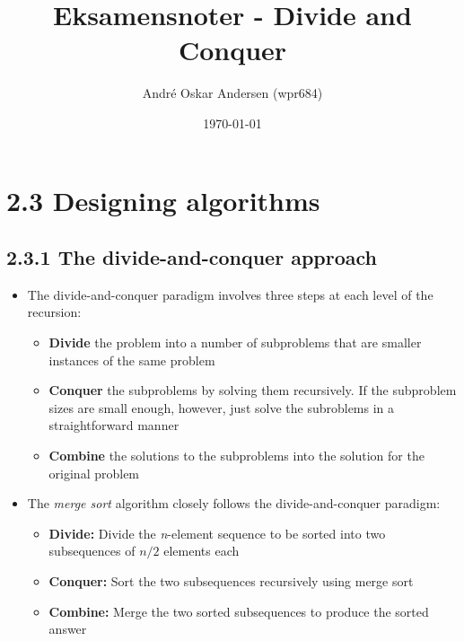 \documentclass{report}
\title{Eksamensnoter - Divide and Conquer}
\author{André Oskar Andersen (wpr684)}
\date{\today}
\begin{document}
\maketitle

\section*{2.3 Designing algorithms}
\subsection*{2.3.1 The divide-and-conquer approach}
\begin{itemize}
    \item The divide-and-conquer paradigm involves three steps at each level of the recursion:
    \begin{itemize}
        \item \textbf{Divide} the problem into a number of subproblems that are smaller instances of the same problem
        \item \textbf{Conquer} the subproblems by solving them recursively. If the subproblem sizes are small enough, however, just solve the subroblems in a straightforward manner
        \item \textbf{Combine} the solutions to the subproblems into the solution for the original problem
    \end{itemize}
    \item The \textit{merge sort} algorithm closely follows the divide-and-conquer paradigm:
    \begin{itemize}
        \item \textbf{Divide:} Divide the \textit{n}-element sequence to be sorted into two subsequences of $n/2$ elements each
        \item \textbf{Conquer:} Sort the two subsequences recursively using merge sort
        \item \textbf{Combine:} Merge the two sorted subsequences to produce the sorted answer
    \end{itemize}
\end{itemize}
\end{document}
